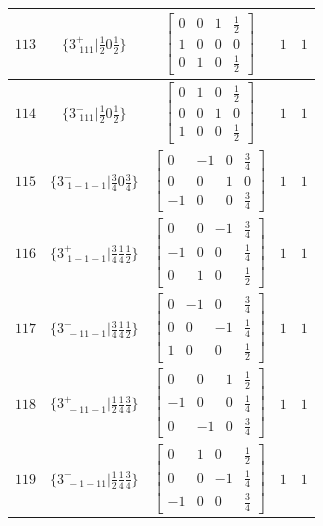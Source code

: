\documentclass[fleqn,8pt]{jsarticle}
\begin{document}
\begin{longtable}{ccccc}
$ 113 $ & $ \{3^{+}_{\,\,111}|\frac{1}{2} 0 \frac{1}{2}\} $ & $ \begin{bmatrix} 0 & 0 & 1 & \frac{1}{2} \\ 1 & 0 & 0 & 0 \\ 0 & 1 & 0 & \frac{1}{2} \end{bmatrix} $ & $ 1 $ & $ 1 $ \\ \hline
$ 114 $ & $ \{3^{-}_{\,\,111}|\frac{1}{2} 0 \frac{1}{2}\} $ & $ \begin{bmatrix} 0 & 1 & 0 & \frac{1}{2} \\ 0 & 0 & 1 & 0 \\ 1 & 0 & 0 & \frac{1}{2} \end{bmatrix} $ & $ 1 $ & $ 1 $ \\ \hline
$ 115 $ & $ \{3^{-}_{\,\,1-1-1}|\frac{3}{4} 0 \frac{3}{4}\} $ & $ \begin{bmatrix} 0 & -1 & 0 & \frac{3}{4} \\ 0 & 0 & 1 & 0 \\ -1 & 0 & 0 & \frac{3}{4} \end{bmatrix} $ & $ 1 $ & $ 1 $ \\ \hline
$ 116 $ & $ \{3^{+}_{\,\,1-1-1}|\frac{3}{4} \frac{1}{4} \frac{1}{2}\} $ & $ \begin{bmatrix} 0 & 0 & -1 & \frac{3}{4} \\ -1 & 0 & 0 & \frac{1}{4} \\ 0 & 1 & 0 & \frac{1}{2} \end{bmatrix} $ & $ 1 $ & $ 1 $ \\ \hline
$ 117 $ & $ \{3^{-}_{\,\,-11-1}|\frac{3}{4} \frac{1}{4} \frac{1}{2}\} $ & $ \begin{bmatrix} 0 & -1 & 0 & \frac{3}{4} \\ 0 & 0 & -1 & \frac{1}{4} \\ 1 & 0 & 0 & \frac{1}{2} \end{bmatrix} $ & $ 1 $ & $ 1 $ \\ \hline
$ 118 $ & $ \{3^{+}_{\,\,-11-1}|\frac{1}{2} \frac{1}{4} \frac{3}{4}\} $ & $ \begin{bmatrix} 0 & 0 & 1 & \frac{1}{2} \\ -1 & 0 & 0 & \frac{1}{4} \\ 0 & -1 & 0 & \frac{3}{4} \end{bmatrix} $ & $ 1 $ & $ 1 $ \\ \hline
$ 119 $ & $ \{3^{-}_{\,\,-1-11}|\frac{1}{2} \frac{1}{4} \frac{3}{4}\} $ & $ \begin{bmatrix} 0 & 1 & 0 & \frac{1}{2} \\ 0 & 0 & -1 & \frac{1}{4} \\ -1 & 0 & 0 & \frac{3}{4} \end{bmatrix} $ & $ 1 $ & $ 1 $ \\ \hline

\end{longtable}
\end{document}
